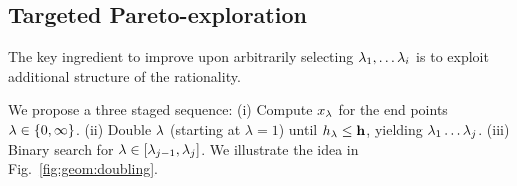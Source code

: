 {%

\subsection{Targeted Pareto-exploration}
The key ingredient to improve upon arbitrarily selecting $\lambda_1, \hdots \lambda_i$ is to exploit additional structure of the rationality.  
%
%

We propose a three staged sequence: (i) Compute $x_\lambda$ for the end
points $\lambda \in \{0, \infty\}$.  (ii) Double $\lambda$ (starting at $\lambda=1$) until $h_\lambda \leq
\mathbf{h}$, yielding $\lambda_1\ldots \lambda_j$.
(iii) Binary search for $\lambda \in [\lambda_{j-1}, \lambda_{j}]$. We illustrate the idea in Fig.~\ref{fig:geom:doubling}.

}
